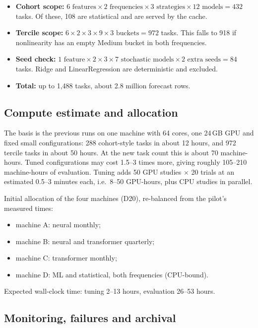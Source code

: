 \documentclass[11pt,a4paper]{article}
\begin{document}
\begin{itemize}
  \item \textbf{Cohort scope:} $6 \text{ features} \times 2 \text{ frequencies} \times 3
  \text{ strategies} \times 12 \text{ models} = 432$ tasks. Of these, 108 are statistical and are
  served by the cache.
  \item \textbf{Tercile scope:} $6 \times 2 \times 3 \times 9 \times 3 \text{ buckets} = 972$
  tasks. This falls to 918 if nonlinearity has an empty Medium bucket in both frequencies.
  \item \textbf{Seed check:} $1 \text{ feature} \times 2 \times 3 \times 7 \text{ stochastic models}
  \times 2 \text{ extra seeds} = 84$ tasks. Ridge and LinearRegression are deterministic and
  excluded.
  \item \textbf{Total:} up to 1,488 tasks, about 2.8 million forecast rows.
\end{itemize}

\subsection{Compute estimate and allocation}

The basis is the previous runs on one machine with 64 cores, one 24\,GB GPU and fixed small
configurations: 288 cohort-style tasks in about 12 hours, and 972 tercile tasks in about 50 hours.
At the new task count this is about 70 machine-hours. Tuned configurations may cost 1.5--3 times
more, giving roughly 105--210 machine-hours of evaluation. Tuning adds 50 GPU studies $\times$ 20
trials at an estimated 0.5--3 minutes each, i.e.\ 8--50 GPU-hours, plus CPU studies in parallel.

Initial allocation of the four machines (D20), re-balanced from the pilot's measured times:
\begin{itemize}
  \item machine A: neural monthly;
  \item machine B: neural and transformer quarterly;
  \item machine C: transformer monthly;
  \item machine D: ML and statistical, both frequencies (CPU-bound).
\end{itemize}
Expected wall-clock time: tuning 2--13 hours, evaluation 26--53 hours.

\subsection{Monitoring, failures and archival}
\end{document}
